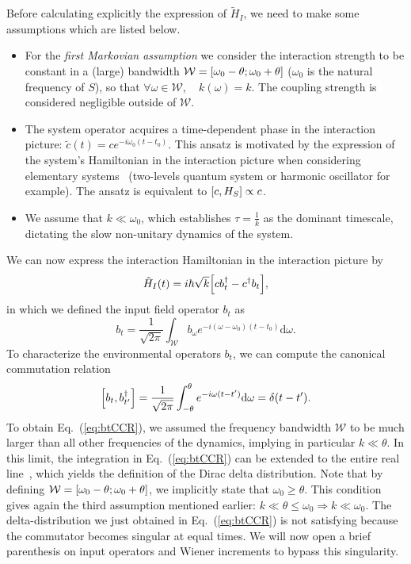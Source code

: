 Before calculating explicitly the expression of $\tilde{H}_I$, we need to make some assumptions which are listed below.
\begin{itemize}
    \item For the \textit{first Markovian assumption} we consider the interaction strength to be constant in a (large) bandwidth $\mathcal{W}=\qty[\omega_0-\theta; \omega_0+\theta]$ ($\omega_0$ is the natural frequency of $S$), so that $\forall \omega\in\mathcal{W},\quad k(\omega)= k$. The coupling strength is considered negligible outside of $\mathcal{W}$.
    \item The system operator acquires a time-dependent phase in the interaction picture: $\tilde{c}(t)=ce^{-i\omega_0 (t-t_0)}$. This ansatz is motivated by the expression of the system's Hamiltonian in the interaction picture when considering elementary systems~\cite{Albarelli} (two-levels quantum system or harmonic oscillator for example). The ansatz is equivalent to $\qty[c,H_S]\propto c$.
    \item We assume that $k\ll\omega_0$, which establishes $\tau=\frac{1}{k}$ as the dominant timescale, dictating the slow non-unitary dynamics of the system.
\end{itemize}
We can now express the interaction Hamiltonian in the interaction picture by
\begin{equation}\label{eq:H_Ipicture}
    \tilde{H}_I(t) = i\hbar\sqrt{k}\qty[c b_t^\dagger-c^\dagger b_t],
\end{equation}
in which we defined the input field operator $b_t$ as
\begin{equation}\label{eq:inputmodes}
    b_t = \frac{1}{\sqrt{2\pi}}\int_\mathcal{W} b_\omega e^{-i(\omega-\omega_0)(t-t_0)}\mathrm{d}\omega.
\end{equation}
To characterize the environmental operators $b_t$, we can compute the canonical commutation relation
\begin{equation}\label{eq:btCCR}
    \qty[b_t,b_{t'}^\dagger] = \frac{1}{\sqrt{2\pi}}\int_{-\theta}^{\theta}e^{-i\omega(t-t')}\mathrm{d}\omega= \delta(t-t').
\end{equation}
To obtain Eq.~(\ref{eq:btCCR}), we assumed the frequency bandwidth $\mathcal{W}$ to be much larger than all other frequencies of the dynamics, implying in particular $k\ll\theta$. In this limit, the integration in Eq.~(\ref{eq:btCCR}) can be extended to the entire real line~\cite{Albarelli,GardinerCollett,Lammers}, which yields the definition of the Dirac delta distribution. Note that by defining $\mathcal{W}=\qty[\omega_0-\theta;\omega_0+\theta]$, we implicitly state that $\omega_0\geq\theta$. This condition gives again the third assumption mentioned earlier: $k\ll\theta\leq\omega_0\Rightarrow k\ll\omega_0$. The delta-distribution we just obtained in Eq.~(\ref{eq:btCCR}) is not satisfying because the commutator becomes singular at equal times. We will now open a brief parenthesis on input operators and Wiener increments to bypass this singularity.


